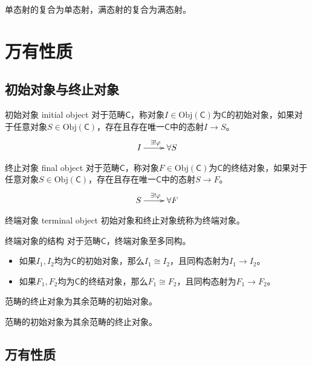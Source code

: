 \begin{proposition}
	单态射的复合为单态射，满态射的复合为满态射。
\end{proposition}

\section{万有性质}

\subsection{初始对象与终止对象}

\begin{definition}{初始对象 initial object}
	对于范畴$\mathsf{C}$，称对象$I\in\mathrm{Obj}(\mathsf{C})$为$\mathsf{C}$的初始对象，如果对于任意对象$S\in\mathrm{Obj}(\mathsf{C})$，存在且存在唯一$\mathsf{C}$中的态射$I\to S$。
	$$
	\xymatrix{
		I\ar[r]^{\exists!\varphi}&\forall S
	}
	$$
\end{definition}

\begin{definition}{终止对象 final object}
	对于范畴$\mathsf{C}$，称对象$F\in\mathrm{Obj}(\mathsf{C})$为$\mathsf{C}$的终结对象，如果对于任意对象$S\in\mathrm{Obj}(\mathsf{C})$，存在且存在唯一$\mathsf{C}$中的态射$S\to F$。
	$$
	\xymatrix{
		S\ar[r]^{\exists!\varphi}&\forall F
	}
	$$
\end{definition}

\begin{definition}{终端对象 terminal object}
	初始对象和终止对象统称为终端对象。
\end{definition}

\begin{proposition}{终端对象的结构}
	对于范畴$\mathsf{C}$，终端对象至多同构。
	\begin{itemize}
		\item 如果$I_1,I_2$均为$\mathsf{C}$的初始对象，那么$I_1\cong I_2$，且同构态射为$I_1\to I_2$。
		\item 如果$F_1,F_2$均为$\mathsf{C}$的终结对象，那么$F_1\cong F_2$，且同构态射为$F_1\to F_2$。
	\end{itemize}
\end{proposition}

\begin{proposition}
	范畴的终止对象为其余范畴的初始对象。
	
	范畴的初始对象为其余范畴的终止对象。
\end{proposition}

\subsection{万有性质}

